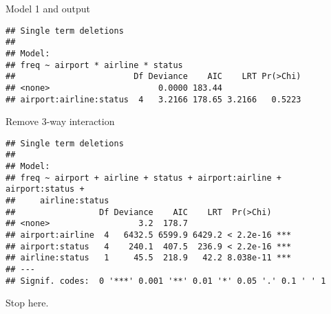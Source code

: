 \begin{frame}[fragile]{Model 1 and output}

   
 {\small
\begin{knitrout}
\color{fgcolor}\begin{kframe}
\begin{alltt}
\hlkwb{=}\hlopt{~}\hlopt{*}\hlopt{*}
    \hlstd{=}\hlstd{)}
\hlstd{=}\hlstd{)}
\end{alltt}
\begin{verbatim}
## Single term deletions
## 
## Model:
## freq ~ airport * airline * status
##                        Df Deviance    AIC    LRT Pr(>Chi)
## <none>                      0.0000 183.44                
## airport:airline:status  4   3.2166 178.65 3.2166   0.5223
\end{verbatim}
\end{kframe}
\end{knitrout}
}


  
\end{frame}

\begin{frame}[fragile]{Remove 3-way interaction}

 {\small
\begin{knitrout}
\color{fgcolor}\begin{kframe}
\begin{alltt}
\hlkwb{=}\hlopt{~}\hlopt{-}\hlopt{:}\hlopt{:}
\hlstd{=}\hlstd{)}
\end{alltt}
\begin{verbatim}
## Single term deletions
## 
## Model:
## freq ~ airport + airline + status + airport:airline + airport:status + 
##     airline:status
##                 Df Deviance    AIC    LRT  Pr(>Chi)    
## <none>                  3.2  178.7                     
## airport:airline  4   6432.5 6599.9 6429.2 < 2.2e-16 ***
## airport:status   4    240.1  407.5  236.9 < 2.2e-16 ***
## airline:status   1     45.5  218.9   42.2 8.038e-11 ***
## ---
## Signif. codes:  0 '***' 0.001 '**' 0.01 '*' 0.05 '.' 0.1 ' ' 1
\end{verbatim}
\end{kframe}
\end{knitrout}
}

Stop here.
  
\end{frame}

